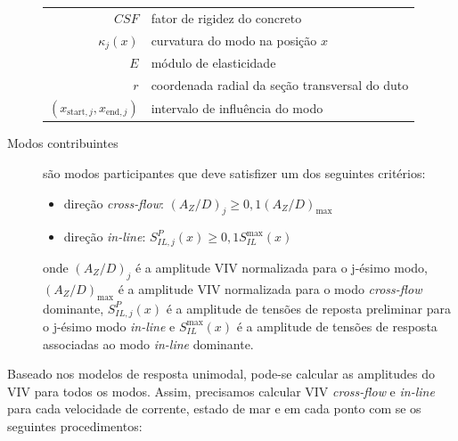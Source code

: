 \begin{description}
    \begin{tabular}{rl}
        $\mathit{CSF}$                            & fator de rigidez do concreto\\
        $\kappa_{j}(x)$                           & curvatura do modo na posição $x$\\
        $E$                                       & módulo de elasticidade\\
        $r$                                       & coordenada radial da seção transversal do duto\\
        $(x_{\text{start},j}, x_{\text{end}, j})$ & intervalo de influência do modo
    \end{tabular}

	\item [Modos contribuintes] são modos participantes que deve satisfizer um dos seguintes critérios:

        \begin{itemize}
    	\item direção \textit{cross-flow}: ${(A_Z/D)}_j \geq 0,1{(A_Z/D)}_{\max}$

        \item direção \textit{in-line}: $S_{\mathit{IL}, \mathit{j}}^{P}(x) \geq 0,1 S_\mathit{IL}^{\max}(x)$
        \end{itemize}

	onde ${(A_Z/D)}_j$ é a amplitude VIV normalizada para o j-ésimo modo, ${(A_Z/D)}_{\max}$ é a amplitude VIV normalizada para o modo \textit{cross-flow}  dominante, $S_{\mathit{IL}, \mathit{j}}^{P}(x)$ é a amplitude de tensões de reposta preliminar para o j-ésimo modo \textit{in-line} e $S_\mathit{IL}^{\max}(x)$ é a amplitude de tensões de resposta associadas ao modo \textit{in-line} dominante.

\end{description}

Baseado nos modelos de resposta unimodal, pode-se calcular as amplitudes do VIV para todos os modos.
Assim, precisamos calcular VIV \textit{cross-flow} e \textit{in-line} para cada velocidade de corrente, estado de mar e em cada ponto com se os seguintes procedimentos:

